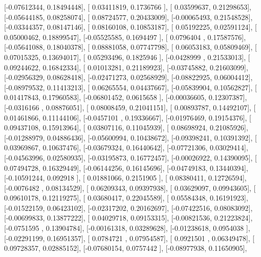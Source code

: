 \documentclass{article}
\begin{document}
       [-0.07612344,  0.18494448],
       [ 0.03411819,  0.1736766 ],
       [ 0.03599637,  0.21298653],
       [-0.05644185,  0.08258074],
       [ 0.08724577,  0.20433009],
       [-0.00065493,  0.21548528],
       [-0.03344357,  0.08147146],
       [ 0.08160108,  0.10853187],
       [ 0.05192225,  0.02591124],
       [ 0.05000462,  0.18899547],
       [-0.05525585,  0.1694497 ],
       [ 0.0796404 ,  0.17587576],
       [-0.05641088,  0.18040378],
       [ 0.08881058,  0.07747798],
       [ 0.06053183,  0.05809469],
       [ 0.07015325,  0.13694017],
       [ 0.05293496,  0.1825946 ],
       [-0.0428999 ,  0.21533013],
       [ 0.09244622,  0.16842334],
       [ 0.01013281,  0.21189923],
       [-0.03745882,  0.21603099],
       [-0.02956329,  0.08628418],
       [-0.02471273,  0.02568929],
       [-0.08822925,  0.06004412],
       [-0.08979532,  0.11413213],
       [ 0.06265554,  0.04437667],
       [-0.05839904,  0.10562827],
       [ 0.01417843,  0.17960583],
       [-0.06801452,  0.0615658 ],
       [-0.00036605,  0.12307387],
       [-0.0316166 ,  0.08876051],
       [ 0.08008459,  0.21041151],
       [ 0.00893787,  0.14492107],
       [ 0.01461866,  0.11144106],
       [-0.0457101 ,  0.19336667],
       [-0.01976469,  0.19154376],
       [ 0.09437108,  0.15913964],
       [ 0.03807116,  0.11045939],
       [ 0.08698924,  0.21085926],
       [-0.01288979,  0.04886436],
       [-0.05600994,  0.10438672],
       [-0.09398241,  0.10391392],
       [ 0.03969867,  0.10637476],
       [-0.03679324,  0.16440642],
       [-0.07721306,  0.03029414],
       [-0.04563996,  0.02580935],
       [-0.03195873,  0.16772457],
       [-0.00026922,  0.14390095],
       [ 0.07494728,  0.16329449],
       [-0.06144256,  0.16145696],
       [-0.04749183,  0.13440394],
       [-0.10591244,  0.092918  ],
       [ 0.01881066,  0.2151905 ],
       [ 0.08380411,  0.12726594],
       [-0.0076482 ,  0.08134529],
       [ 0.06209343,  0.09397938],
       [ 0.03629097,  0.09943605],
       [ 0.09610178,  0.12119275],
       [ 0.03680417,  0.22045589],
       [ 0.05584348,  0.16191923],
       [-0.01522159,  0.06423102],
       [-0.02317202,  0.20162697],
       [-0.07422516,  0.08083092],
       [-0.00699833,  0.13877222],
       [ 0.04029718,  0.09153315],
       [-0.00821536,  0.21223824],
       [-0.0751595 ,  0.13904784],
       [-0.00161318,  0.03289628],
       [-0.01238618,  0.0954038 ],
       [-0.02291199,  0.16951357],
       [ 0.0784721 ,  0.07954587],
       [ 0.0921501 ,  0.06349478],
       [ 0.09728357,  0.02885152],
       [-0.07680154,  0.0757442 ],
       [-0.08977938,  0.11650905],
\end{document}
